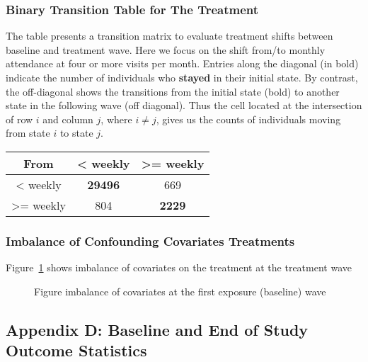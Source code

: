 \documentclass[
  single column]{article}
\begin{document}
\subsubsection{Binary Transition Table for The
Treatment}\label{binary-transition-table-for-the-treatment}

The table presents a transition matrix to evaluate treatment shifts
between baseline and treatment wave. Here we focus on the shift from/to
monthly attendance at four or more visits per month. Entries along the
diagonal (in bold) indicate the number of individuals who
\textbf{stayed} in their initial state. By contrast, the off-diagonal
shows the transitions from the initial state (bold) to another state in
the following wave (off diagonal). Thus the cell located at the
intersection of row \(i\) and column \(j\), where \(i \neq j\), gives us
the counts of individuals moving from state \(i\) to state \(j\).

\begin{longtable}[]{@{}ccc@{}}
\toprule\noalign{}
From & \textless{} weekly & \textgreater= weekly \\
\midrule\noalign{}
\endhead
\bottomrule\noalign{}
\endlastfoot
\textless{} weekly & \textbf{29496} & 669 \\
\textgreater= weekly & 804 & \textbf{2229} \\
\end{longtable}

\subsubsection{Imbalance of Confounding Covariates
Treatments}\label{imbalance-of-confounding-covariates-treatments}

Figure~\ref{fig-match_1} shows imbalance of covariates on the treatment
at the treatment wave

\begin{figure}


\caption{\label{fig-match_1}Figure imbalance of covariates at the first
exposure (baseline) wave}

\end{figure}%

\subsection{Appendix D: Baseline and End of Study Outcome
Statistics}\label{appendix-outcomes}
\end{document}
